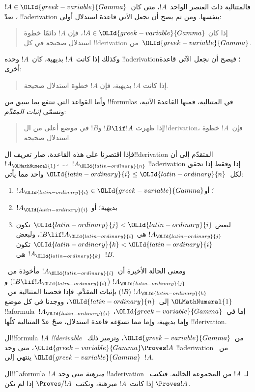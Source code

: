 \documentclass[../../../include/open-logic-section]{subfiles}
\begin{document}
فالمتتالية ذات العنصر الواحد~$!A$، متى كان~$!A \in \OLId{greek-variable}{Gamma}$،
تعدّ !!a{derivation} بنفسها. ومن ثم يصح أن نجعل الآتي
قاعدة استدلال أولى:
\begin{quote}
  إذا كان $!A \in \OLId{greek-variable}{Gamma}$، فإن $!A$ دائمًا خطوة استدلال صحيحة في كل
  !!{derivation} من~$\OLId{greek-variable}{Gamma}$.
\end{quote}
وكذلك إذا كانت~$!A$ بديهية، كان~$!A$ وحده !!a{derivation}؛
فيصح أن نجعل الآتي قاعدة أخرى:
\begin{quote}
  إذا كانت $!A$ بديهية، فإن $!A$ خطوة استدلال صحيحة.
\end{quote}
وأما القواعد التي تنتفع بما سبق من !!{formula}s في المتتالية،
فمنها القاعدة الآتية، وتسمّى \emph{إثبات المقدَّم}:
\begin{quote}
  إذا ظهرت $!B \lif !A$ و$!B$ في موضع أعلى من ال!!{derivation}،
  فإن~$!A$ خطوة استدلال صحيحة.
\end{quote}
فإذا اقتصرنا على هذه القاعدة، صار تعريف ال!!{derivation}
المتقدّم إلى أن~$!A_\OLMathNumeral{1}$، \dots،~$!A_\OLId{latin-ordinary}{n}$ !!a{derivation}
إذا وفقط إذا تحقق لكل~$\OLId{latin-ordinary}{i} \le \OLId{latin-ordinary}{n}$ واحد مما يأتي:
\begin{enumerate}
\item $!A_\OLId{latin-ordinary}{i} \in \OLId{greek-variable}{Gamma}$؛ أو
\item $!A_\OLId{latin-ordinary}{i}$ بديهية؛ أو
\item لبعض $\OLId{latin-ordinary}{j} < \OLId{latin-ordinary}{i}$ تكون $!A_\OLId{latin-ordinary}{j}$ هي $!B \lif !A_\OLId{latin-ordinary}{i}$، ولبعض $\OLId{latin-ordinary}{k} < \OLId{latin-ordinary}{i}$ تكون
  $!A_\OLId{latin-ordinary}{k}$ هي~$!B$.
\end{enumerate}
ومعنى الحالة الأخيرة أن~$!A_\OLId{latin-ordinary}{i}$ مأخوذة من~$!A_\OLId{latin-ordinary}{j}$
($!B \lif !A_\OLId{latin-ordinary}{i}$) و$!A_\OLId{latin-ordinary}{k}$ ($!B$) بإثبات المقدَّم.
فإذا فحصنا المتتالية من~$\OLMathNumeral{1}$ إلى~$\OLId{latin-ordinary}{n}$، ووجدنا في كل موضع
!!a{formula}~$!A_\OLId{latin-ordinary}{i}$ إما في~$\OLId{greek-variable}{Gamma}$، وإما بديهية، وإما مما
تسوّغه قاعدة استدلال، صحّ عدّ المتتالية كلّها !!{derivation}.


\begin{defn}[!!^{derivability}]
ال!!{formula}~$!A$ \emph{!!{derivable}} من~$\OLId{greek-variable}{Gamma}$،
وترميز ذلك~$\OLId{greek-variable}{Gamma} \Proves !A$، متى وجد !!a{derivation}
من~$\OLId{greek-variable}{Gamma}$ ينتهي إلى~$!A$.
\end{defn}

\begin{defn}[المبرهنات]
ال!!^a{formula}~$!A$ \emph{مبرهنة} متى وجد !!a{derivation}
لـ~$!A$ من المجموعة الخالية. فنكتب~$\Proves !A$ إذا كانت~$!A$
مبرهنة، ونكتب~$\Proves/ !A$ إذا لم تكن.
\end{defn}
\end{document}
